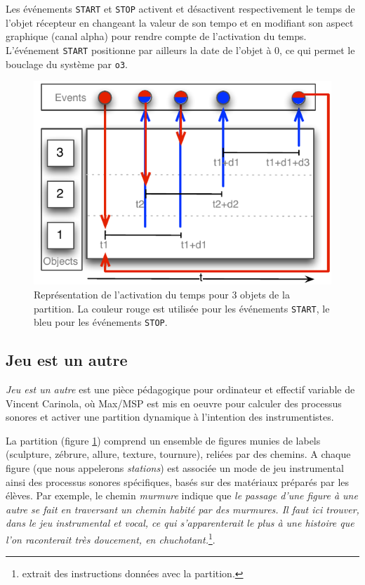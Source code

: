 \documentclass{article}
\newcommand{\OSC}[1]	{{\fontsize{9pt}{9pt} \selectfont\texttt{#1}}}
\begin{document}
Les événements \OSC{START} et \OSC{STOP} activent et désactivent respectivement le temps de l'objet récepteur en changeant la valeur de son tempo et en modifiant son aspect graphique (canal alpha) pour rendre compte de l'activation du temps. L'événement \OSC{START} positionne par ailleurs la date de l'objet à 0, ce qui permet le bouclage du système par \OSC{o3}.
\begin{figure}[h]
   \centering
   \includegraphics[width=0.8\columnwidth]{imgs/sample}
   \caption{Représentation de l'activation du temps pour 3 objets de la partition. La couleur rouge est utilisée pour les événements \OSC{START}, le bleu pour les événements \OSC{STOP}.}
   \label{fig:sample}
\end{figure}


\subsection{Jeu est un autre}

\emph{Jeu est un autre} est une pièce pédagogique pour ordinateur et effectif variable de Vincent Carinola, où Max/MSP est mis en oeuvre pour calculer des processus sonores et activer une partition dynamique à l'intention des instrumentistes. 

La partition (figure \ref{fig:sample}) comprend un ensemble de figures munies de labels (sculpture, zébrure, allure, texture, tournure), reliées par des chemins. A chaque figure (que nous appelerons \emph{stations}) est associée un mode de jeu instrumental ainsi des processus sonores spécifiques, basés sur des matériaux préparés par les élèves. Par exemple, le chemin \emph{murmure} indique que \emph{le passage d'une figure à une autre se fait en traversant un chemin habité par des murmures. Il faut ici trouver, dans le jeu instrumental et vocal, ce qui s'apparenterait le plus à une histoire que l'on raconterait très doucement, en chuchotant.}\footnote{extrait des instructions données avec la partition.}.
\end{document}
